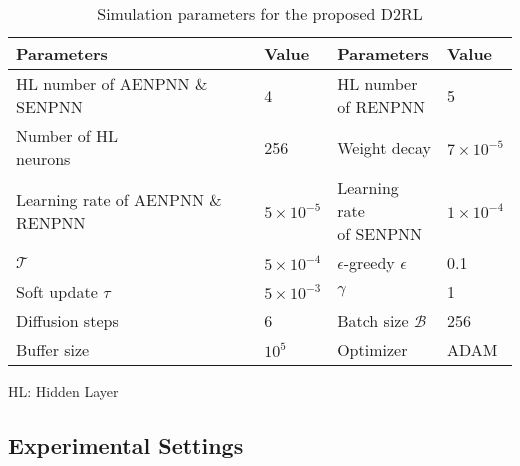 \documentclass[comsoc,journal]{IEEEtran}
\begin{document}
\begin{table}[ht]
\centering
\caption{Simulation parameters for the proposed D2RL}
\label{table2}
\begin{tabular}{l  l  l  l }
\hline
\textbf{Parameters} & \textbf{Value}&\textbf{Parameters} & \textbf{Value} \\ \hline
\makecell[l]{HL number\\ of AENPNN \\ $\&$ SENPNN}  & 4 & \makecell[l]{HL number\\of RENPNN} &5\\
\makecell[l]{Number of HL\\ neurons} &256 & Weight decay & $7 \times 10^{-5}$ \\
\makecell[l]{Learning rate\\ of AENPNN \\ $\&$ RENPNN}  & $5 \times 10^{-5}$  &\makecell[l]{Learning rate\\ of SENPNN}  & $1 \times 10^{-4}$ \\
$\mathcal{T}$ &$5 \times 10^{-4}$  &$\epsilon$-greedy $\epsilon$ & 0.1 \\ 
Soft update $\tau$ & $5 \times 10^{-3}$ 
&$\gamma$ & 1  \\ 
Diffusion steps  & 6  
&Batch size $\mathcal{B}$ & 256 \\ 
Buffer size & $10^5$ 
&Optimizer & ADAM \\ \hline
\end{tabular}
\begin{tablenotes}
\small
\item HL: Hidden Layer
\end{tablenotes}
\vspace{-.1cm}
\end{table}


\vspace{-8pt}
\subsection{Experimental Settings}
\end{document}
